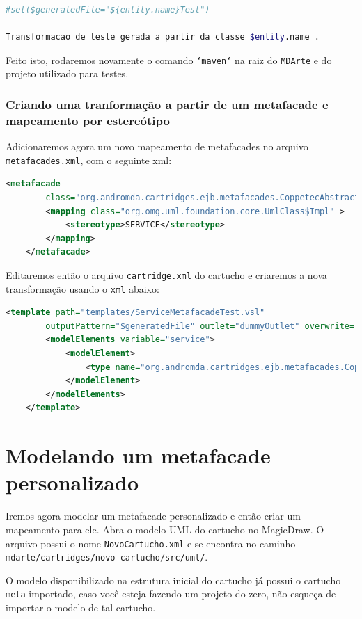 \begin{lstlisting}[language=bash]
#set($generatedFile="${entity.name}Test")

Transformacao de teste gerada a partir da classe $entity.name .
\end{lstlisting}

Feito isto, rodaremos novamente o comando \texttt{`maven`} na raiz do
\texttt{MDArte} e do projeto utilizado para testes.

\subsubsection{Criando uma tranformação a partir de um metafacade e mapeamento
por estereótipo}
Adicionaremos agora um novo mapeamento de metafacades no arquivo
\texttt{metafacades.xml}, com o seguinte xml:

\begin{lstlisting}[language=xml]
	<metafacade
		class="org.andromda.cartridges.ejb.metafacades.CoppetecAbstractServiceFacadeLogicImpl">
		<mapping class="org.omg.uml.foundation.core.UmlClass$Impl" >
			<stereotype>SERVICE</stereotype> 
		</mapping>
    </metafacade>
\end{lstlisting}


Editaremos então o arquivo \texttt{cartridge.xml} do cartucho e criaremos a nova
transformação usando o \texttt{xml} abaixo:

\begin{lstlisting}[language=xml]
	<template path="templates/ServiceMetafacadeTest.vsl"
		outputPattern="$generatedFile" outlet="dummyOutlet" overwrite="true">
		<modelElements variable="service">
            <modelElement>
                <type name="org.andromda.cartridges.ejb.metafacades.CoppetecAbstractServiceFacadeLogicImpl" />
            </modelElement>
        </modelElements>
    </template>
\end{lstlisting}

\section{Modelando um metafacade personalizado}
Iremos agora modelar um metafacade personalizado e então criar um mapeamento
para ele. Abra o modelo UML do cartucho no MagicDraw. O arquivo possui o nome
\texttt{NovoCartucho.xml} e se encontra no caminho
\texttt{mdarte/cartridges/novo-cartucho/src/uml/}.

O modelo disponibilizado na estrutura inicial do cartucho já possui o cartucho
\texttt{meta} importado, caso você esteja fazendo um projeto do zero, não
esqueça de importar o modelo de tal cartucho.

